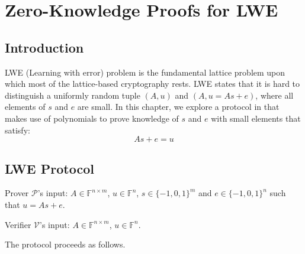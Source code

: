 \chapter{Zero-Knowledge Proofs for LWE}

\section{Introduction}

LWE (Learning with error) problem is the fundamental lattice problem upon which most of the lattice-based cryptography rests. LWE states that it is hard to distinguish a uniformly random tuple $(A, u)$ and $(A, u = As+e)$, where all elements of $s$ and $e$ are small. In this chapter, we explore a protocol in \cite{lwe} that makes use of polynomials to prove knowledge of $s$ and $e$ with small elements that satisfy:
$$
    As + e = u
$$

\section{LWE Protocol}

Prover $\mathcal{P}$'s input: $A \in \mathbb{F}^{n \times m}$, $u \in \mathbb{F}^{n}$, $s \in \{-1, 0, 1\}^{m}$ and $e \in \{-1, 0, 1\}^{n}$ such that $u = As + e$.

Verifier $\mathcal{V}$'s input: $A \in \mathbb{F}^{n \times m}$, $u \in \mathbb{F}^{n}$.

The protocol proceeds as follows.



